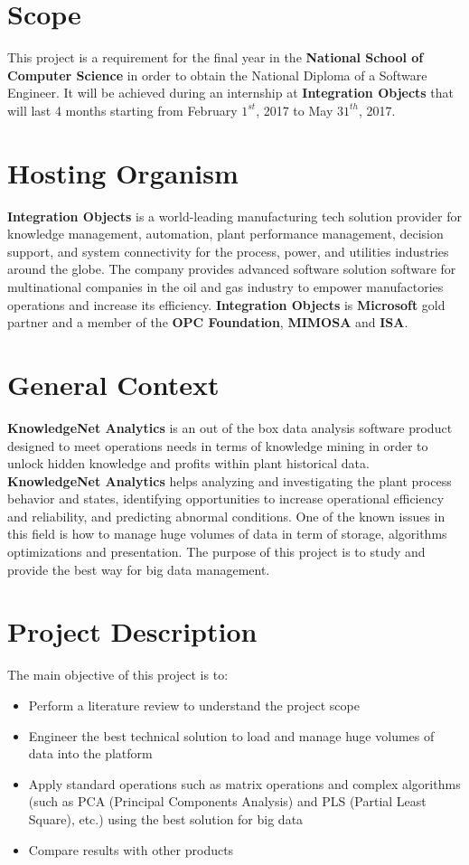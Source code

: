 \documentclass[a4paper]{report}
\begin{document}
\section{Scope}

This project is a requirement for the final year in the \textbf{National School of Computer Science} in order to obtain the National Diploma of a Software Engineer. It will be achieved during an internship
at \textbf{Integration Objects} that will last 4 months starting from February $1^{st}$, 2017 to May $31^{th}$, 2017.
\section{Hosting Organism}

\textbf{Integration Objects} is a world-leading manufacturing tech solution provider for knowledge
management, automation, plant performance management, decision support, and system connectivity
for the process, power, and utilities industries around the globe. The company provides advanced
software solution software for multinational companies in the oil and gas industry to empower
manufactories operations and increase its efficiency. \textbf{Integration Objects} is \textbf{Microsoft} gold partner
and a member of the \textbf{OPC Foundation}, \textbf{MIMOSA} and \textbf{ISA}.
\section{General Context}

\textbf{KnowledgeNet Analytics} is an out of the box data analysis software product designed to meet operations needs in terms of knowledge mining in order to unlock hidden knowledge and profits within plant historical data. \textbf{KnowledgeNet Analytics} helps analyzing and investigating the plant process behavior and states, identifying opportunities to increase operational efficiency and reliability, and predicting abnormal conditions. One of the known issues in this field is how to manage huge volumes of data in term of storage, algorithms optimizations and presentation. The purpose of this project is to study and provide the best way for big data management.
\section{Project Description}

The main objective of this project is to:
\begin{itemize}
\item Perform a literature review to understand the project scope
\item Engineer the best technical solution to load and manage huge volumes of data into the platform
\item Apply standard operations such as matrix operations and complex algorithms (such as PCA (Principal Components Analysis) and PLS (Partial Least Square), etc.) using the best solution for big data
\item Compare results with other products
\end{itemize}
\end{document}
